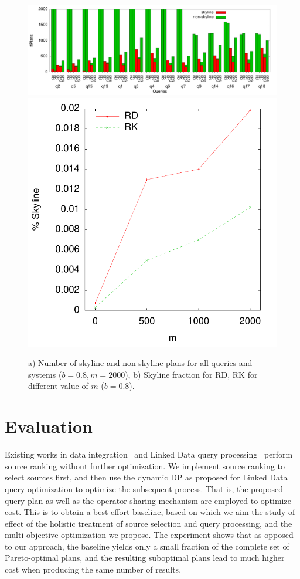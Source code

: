 \begin{figure}[htb]
  \centering
  \includegraphics[width=0.75\linewidth]{figs/all_queries.pdf}
  \includegraphics[width=0.24\linewidth]{figs/plans_skyline_by_m.pdf}
  \caption{a) Number of skyline and non-skyline plans for all queries
    and systems ($b=0.8, m=2000$), b) Skyline fraction for RD, RK for
    different value of $m$ ($b=0.8$).}
  \label{fig:queries}
\end{figure}

\section{Evaluation}
\label{sec:eva}
Existing works in data integration~\cite{levy_querying_1996} and Linked Data query processing~\cite{harth_data_2010,ladwig_linked_2010} perform source ranking
without further optimization. We implement source ranking to select sources first, and then use the dynamic DP as proposed for Linked Data query optimization to optimize
the subsequent process. That is, the proposed query plan as well as
the operator sharing mechanism are employed to optimize cost. This is
to obtain a best-effort baseline, based on which we aim the study of
effect of the holistic treatment of source selection and query
processing, and the multi-objective optimization we propose. The
experiment shows that as opposed to our approach, the baseline yields
only a small fraction of the complete set of Pareto-optimal plans, and
the resulting suboptimal plans lead to much higher cost when producing
the same number of results.


